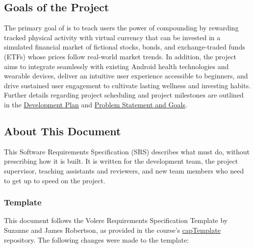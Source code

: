 \documentclass[12pt]{article}
\newcommand{\acr}[3]{\phantomsection\label{acr:#1}#2 (#3)}
\begin{document}
\subsection{Goals of the Project}
The primary goal of \progname{} is to teach users the power of compounding by
rewarding tracked physical activity with virtual currency that can be invested
in a simulated financial market of fictional stocks, bonds, and \acr{ETF}{exchange-traded funds}{ETFs} whose
prices follow real-world market trends. In
addition, the project aims to integrate seamlessly with existing Android health
technologies and wearable devices, deliver an intuitive user experience
accessible to beginners, and drive sustained user engagement to cultivate lasting wellness and investing habits. Further
details regarding project scheduling and project milestones are
outlined in the
\href{https://github.com/arjunkarthik123/fitness-finance-application/blob/main/pdfs/DevelopmentPlan/DevelopmentPlan.pdf}{Development Plan}
and \href{https://github.com/arjunkarthik123/fitness-finance-application/blob/main/pdfs/ProblemStatementAndGoals/ProblemStatement.pdf}{Problem Statement and Goals}.


\subsection{About This Document}
\label{sec:about}

This \acr{SRS}{Software Requirements Specification}{SRS} describes what
\progname{} must do, without prescribing how it is built. It is written for the
development team, the project supervisor, teaching assistants and reviewers,
and new team members who need to get up to speed on the project.

\subsubsection{Template}

This document follows the Volere Requirements Specification Template by
Suzanne and James Robertson, as provided in the course's
\href{https://github.com/smiths/capTemplate}{capTemplate} repository. The
following changes were made to the template:
\end{document}
